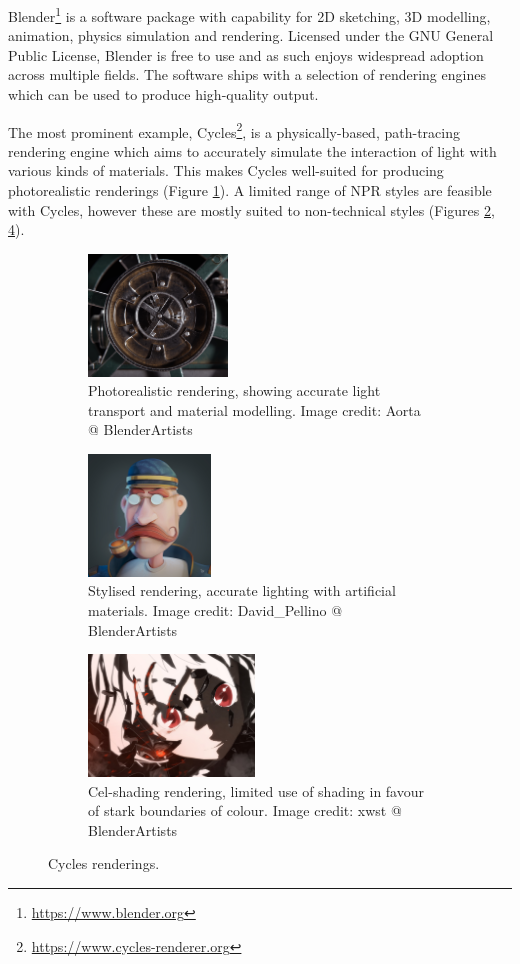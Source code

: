 Blender\footnote{\url{https://www.blender.org}} is a software package with capability for 2D sketching, 3D modelling, animation, physics simulation and rendering.
Licensed under the GNU General Public License, Blender is free to use and as such enjoys widespread adoption across multiple fields.
The software ships with a selection of rendering engines which can be used to produce high-quality output.

The most prominent example, Cycles\footnote{\url{https://www.cycles-renderer.org}}, is a physically-based, path-tracing rendering engine which aims to accurately simulate the interaction of light with various kinds of materials.
This makes Cycles well-suited for producing photorealistic renderings (Figure \ref{ex_photoreal}).
A limited range of NPR styles are feasible with Cycles, however these are mostly suited to non-technical styles (Figures \ref{ex_toon1}, \ref{ex_toon2}).

\begin{figure}[h]
	\centering
	\begin{subfigure}[b]{0.3\textwidth}
		\includegraphics[height=3.25cm]{images/ex_photoreal}
		\caption{Photorealistic rendering, showing accurate light transport and material modelling. Image credit: Aorta @ BlenderArtists}\label{ex_photoreal}
	\end{subfigure}
	\begin{subfigure}[b]{0.3\textwidth}
		\includegraphics[height=3.25cm]{images/ex_toon1}
		\caption{Stylised rendering, accurate lighting with artificial materials. Image credit: David\_Pellino @ BlenderArtists}\label{ex_toon1}
	\end{subfigure}
	\begin{subfigure}[b]{0.3\textwidth}
		\includegraphics[height=3.25cm]{images/ex_toon2}
		\caption{Cel-shading rendering, limited use of shading in favour of stark boundaries of colour. Image credit: xwst @ BlenderArtists}\label{ex_toon2}
	\end{subfigure}
	\caption{Cycles renderings.}
\end{figure}


